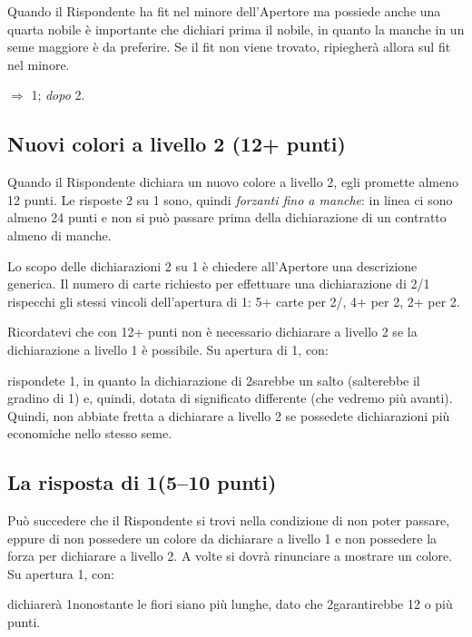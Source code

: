 \documentclass[../corsofiori.tex]{subfiles}
\begin{document}
Quando il Rispondente ha fit nel minore dell'Apertore ma possiede anche una quarta nobile è importante che dichiari
prima il nobile, in quanto la manche in un seme maggiore è da preferire. Se il fit non viene trovato, ripiegherà allora
sul fit nel minore.

$\Rightarrow$ 1\Sp; \emph{dopo} 2\Di.


\subsection{Nuovi colori a livello 2 (12+ punti)}

Quando il Rispondente dichiara un nuovo colore a livello 2, egli promette almeno 12 punti. Le risposte 2 su 1 sono,
quindi \emph{forzanti fino a manche}: in linea ci sono almeno 24 punti e non si può passare prima della dichiarazione
di un contratto almeno di manche.

Lo scopo delle dichiarazioni 2 su 1 è chiedere all'Apertore una descrizione generica. Il numero di carte richiesto per
effettuare una dichiarazione di 2/1 rispecchi gli stessi vincoli dell'apertura di 1: 5+ carte per 2\He/\Sp, 4+ per 2\Di,
2+ per 2\Cl.

Ricordatevi che con 12+ punti non è necessario dichiarare a livello 2 se la dichiarazione a livello 1 è possibile. Su
apertura di 1\Di, con:

\smallskip
{}

\noindent
rispondete 1\He, in quanto la dichiarazione di 2\He sarebbe un salto (salterebbe il gradino di 1\He) e, quindi, dotata
di significato differente (che vedremo più avanti). Quindi, non abbiate fretta a dichiarare a livello 2 se possedete
dichiarazioni più economiche nello stesso seme.

\subsection{La risposta di 1\SA (5--10 punti)}

Può succedere che il Rispondente si trovi nella condizione di non poter passare, eppure di non possedere un colore da
dichiarare a livello 1 e non possedere la forza per dichiarare a livello 2. A volte si dovrà rinunciare a mostrare un
colore. Su apertura 1\He, con:


\noindent
dichiarerà 1\Sp nonostante le fiori siano più lunghe, dato che 2\Cl garantirebbe 12 o più punti.
\end{document}
